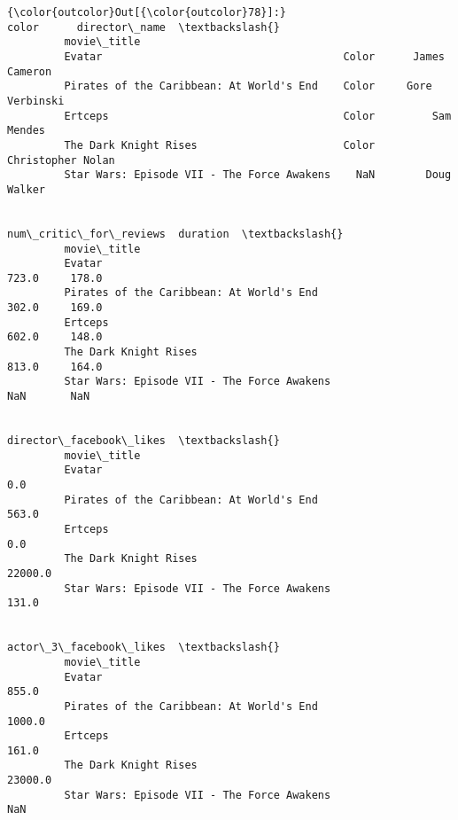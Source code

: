 \documentclass[11pt]{article}
\begin{document}
\begin{Verbatim}[commandchars=\\\{\}]
{\color{outcolor}Out[{\color{outcolor}78}]:}                                             color      director\_name  \textbackslash{}
         movie\_title                                                            
         Evatar                                      Color      James Cameron   
         Pirates of the Caribbean: At World's End    Color     Gore Verbinski   
         Ertceps                                     Color         Sam Mendes   
         The Dark Knight Rises                       Color  Christopher Nolan   
         Star Wars: Episode VII - The Force Awakens    NaN        Doug Walker   
         
                                                     num\_critic\_for\_reviews  duration  \textbackslash{}
         movie\_title                                                                    
         Evatar                                                       723.0     178.0   
         Pirates of the Caribbean: At World's End                     302.0     169.0   
         Ertceps                                                      602.0     148.0   
         The Dark Knight Rises                                        813.0     164.0   
         Star Wars: Episode VII - The Force Awakens                     NaN       NaN   
         
                                                     director\_facebook\_likes  \textbackslash{}
         movie\_title                                                           
         Evatar                                                          0.0   
         Pirates of the Caribbean: At World's End                      563.0   
         Ertceps                                                         0.0   
         The Dark Knight Rises                                       22000.0   
         Star Wars: Episode VII - The Force Awakens                    131.0   
         
                                                     actor\_3\_facebook\_likes  \textbackslash{}
         movie\_title                                                          
         Evatar                                                       855.0   
         Pirates of the Caribbean: At World's End                    1000.0   
         Ertceps                                                      161.0   
         The Dark Knight Rises                                      23000.0   
         Star Wars: Episode VII - The Force Awakens                     NaN   
         

\end{Verbatim}
\end{document}

